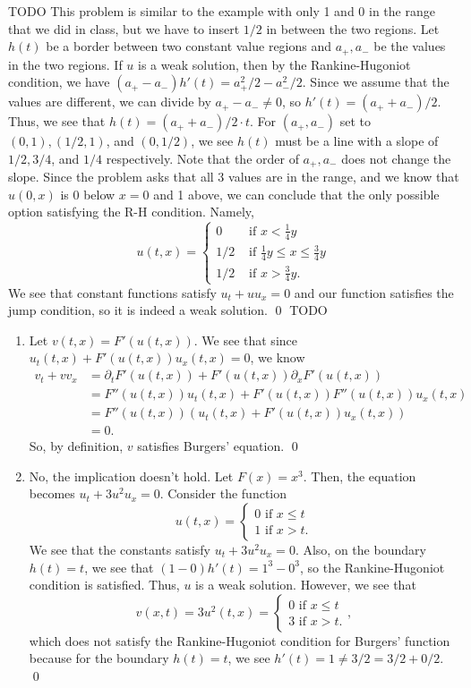 \documentclass{article}
\renewcommand{\d}{\partial}
\begin{document}
\newpage
{} TODO
\hop
\solution
This problem is similar to the example with only 1 and 0 in the range that we did in class, but we have to insert $1/2$ in between the two regions.
\hop 
Let $h(t)$ be a border between two constant value regions and $a_+, a_-$ be the values in the two regions. If $u$ is a weak solution, then by the Rankine-Hugoniot condition, we have $(a_+-a_-)h'(t) = a_+^2/2-a_-^2/2$. Since we assume that the values are different, we can divide by $a_+-a_- \ne 0$, so $h'(t) = (a_++a_-)/2$. Thus, we see that $h(t)= (a_++a_-)/2 \cdot t$. For $(a_+,a_-)$ set to $(0,1), (1/2, 1)$, and $(0, 1/2)$, we see $h(t)$ must be a line with a slope of $1/2, 3/4$, and $1/4$ respectively. Note that the order of $a_+,a_-$ does not change the slope. Since the problem asks that all 3 values are in the range, and we know that $u(0,x)$ is 0 below $x=0$ and 1 above, we can conclude that the only possible option satisfying the R-H condition. Namely, 
\[u(t,x)= \begin{cases}
    0 &\text{ if } x <  \frac{1}{4}y \\
    1/2 &\text{ if } \frac{1}{4}y \le x \le  \frac{3}{4}y \\
    1/2 &\text{ if }x > \frac{3}{4}y.
\end{cases}\]
We see that constant functions satisfy $u_t + uu_x=0$ and our function satisfies the jump condition, so it is indeed a weak solution. \qed
\newpage
{} TODO
\hop
\solution
\begin{enumerate}
    \item Let $v(t,x) = F'(u(t,x))$. We see that since $u_t(t,x) + F'(u(t,x))u_x(t,x) = 0$, we know 
    \begin{align*}
        v_t + vv_x &= \d_tF'(u(t,x)) + F'(u(t,x))\d_xF'(u(t,x))\\
        &= F''(u(t,x))u_t(t,x) + F'(u(t,x))F''(u(t,x))u_x(t,x) \\
        &=F''(u(t,x))(u_t(t,x) + F'(u(t,x))u_x(t,x))\\
        &= 0.
    \end{align*}
    So, by definition, $v$ satisfies Burgers' equation. \qed
    \item No, the implication doesn't hold. Let $F(x) = x^3$. Then, the equation becomes $u_t + 3u^2u_x = 0$. Consider the function 
    \[u(t,x) = \begin{cases}
        0 \text{ if } x \le t \\
        1 \text{ if } x > t.
    \end{cases}\]
    We see that the constants satisfy $u_t + 3u^2u_x = 0$. Also, on the boundary $h(t) = t$, we see that $(1-0)h'(t) = 1^3 - 0^3$, so the Rankine-Hugoniot condition is satisfied. Thus, $u$ is a weak solution. However, we see that 
    \[v(x,t) = 3u^2(t,x) = \begin{cases}
        0 \text{ if } x \le t \\
        3 \text{ if } x > t.
    \end{cases},\]
    which does not satisfy the Rankine-Hugoniot condition for Burgers' function because for the boundary $h(t) = t$, we see $h'(t) = 1 \ne 3/2 = 3/2+0/2$. \qed 
\end{enumerate}
\end{document}
